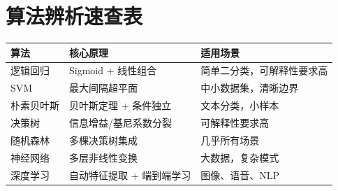 \documentclass[11pt,a4paper]{article}
\begin{document}
\section{算法辨析速查表}

\begin{orangebox}[常用分类算法速查]
\begin{center}
\begin{tabular}{lll}
\textbf{算法} & \textbf{核心原理} & \textbf{适用场景} \\
\hline
逻辑回归 & Sigmoid + 线性组合 & 简单二分类，可解释性要求高 \\
SVM & 最大间隔超平面 & 中小数据集，清晰边界 \\
朴素贝叶斯 & 贝叶斯定理 + 条件独立 & 文本分类，小样本 \\
决策树 & 信息增益/基尼系数分裂 & 可解释性要求高 \\
随机森林 & 多棵决策树集成 & 几乎所有场景 \\
神经网络 & 多层非线性变换 & 大数据，复杂模式 \\
深度学习 & 自动特征提取 + 端到端学习 & 图像、语音、NLP \\
\end{tabular}
\end{center}
\end{orangebox}
\end{document}
